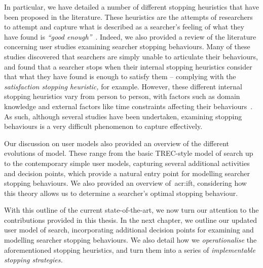 In particular, we have detailed a number of different stopping heuristics that have been proposed in the literature. These heuristics are the attempts of researchers to attempt and capture what is described as a searcher's feeling of what they have found is \emph{``good enough''}~\citep{zach2005enough_is_enough}. Indeed, we also provided a review of the literature concerning user studies examining searcher stopping behaviours. Many of these studies discovered that searchers are simply unable to articulate their behaviours, and found that a searcher stops when their internal stopping heuristics consider that what they have found is enough to satisfy them -- complying with the \emph{satisfaction stopping heuristic,} for example. However, these different internal stopping heuristics vary from person to person, with factors such as domain knowledge and external factors like time constraints affecting their behaviours~\cite{marchionini1995information_seeking}. As such, although several studies have been undertaken, examining stopping behaviours is a very difficult phenomenon to capture effectively.

Our discussion on user models also provided an overview of the different evolutions of model. These range from the basic TREC-style model of search up to the contemporary simple user models, capturing several additional activities and decision points, which provide a natural entry point for modelling searcher stopping behaviours. We also provided an overview of~\gls{acr:ift}, considering how this theory allows us to determine a searcher's optimal stopping behaviour.

With this outline of the current state-of-the-art, we now turn our attention to the contributions provided in this thesis. In the next chapter, we outline our updated user model of search, incorporating additional decision points for examining and modelling searcher stopping behaviours. We also detail how we \emph{operationalise} the aforementioned stopping heuristics, and turn them into a series of \emph{implementable stopping strategies.}











